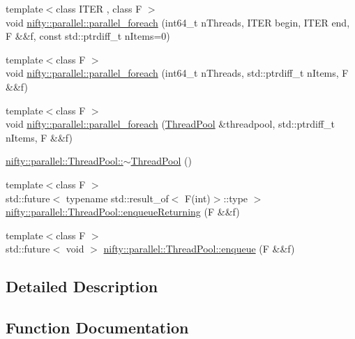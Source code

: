 \begin{DoxyCompactItemize}
{\footnotesize template$<$class I\+T\+ER , class F $>$ }\\void \hyperlink{group__ParallelProcessing_gae081bc77f03a070b9fe0f97966949f58}{nifty\+::parallel\+::parallel\+\_\+foreach} (int64\+\_\+t n\+Threads, I\+T\+ER begin, I\+T\+ER end, F \&\&f, const std\+::ptrdiff\+\_\+t n\+Items=0)
\item 
{\footnotesize template$<$class F $>$ }\\void \hyperlink{group__ParallelProcessing_ga900cd2b90fda714e21082d5ba897f240}{nifty\+::parallel\+::parallel\+\_\+foreach} (int64\+\_\+t n\+Threads, std\+::ptrdiff\+\_\+t n\+Items, F \&\&f)
\item 
{\footnotesize template$<$class F $>$ }\\void \hyperlink{group__ParallelProcessing_gaf78ef995aaa44624da018033fd03beeb}{nifty\+::parallel\+::parallel\+\_\+foreach} (\hyperlink{classnifty_1_1parallel_1_1ThreadPool}{Thread\+Pool} \&threadpool, std\+::ptrdiff\+\_\+t n\+Items, F \&\&f)
\item 
\hyperlink{group__ParallelProcessing_ga77c519ec32559623c64d61f532c570b8}{nifty\+::parallel\+::\+Thread\+Pool\+::$\sim$\+Thread\+Pool} ()
\item 
{\footnotesize template$<$class F $>$ }\\std\+::future$<$ typename std\+::result\+\_\+of$<$ F(int)$>$\+::type $>$ \hyperlink{group__ParallelProcessing_ga5ffeb64ca8f60c37ad2db97bf80b05af}{nifty\+::parallel\+::\+Thread\+Pool\+::enqueue\+Returning} (F \&\&f)
\item 
{\footnotesize template$<$class F $>$ }\\std\+::future$<$ void $>$ \hyperlink{group__ParallelProcessing_ga030f79847ecd6a609877dd5f997ac875}{nifty\+::parallel\+::\+Thread\+Pool\+::enqueue} (F \&\&f)
\end{DoxyCompactItemize}


\subsection{Detailed Description}


\subsection{Function Documentation}
\mbox{\label{group__ParallelProcessing_ga030f79847ecd6a609877dd5f997ac875}} 
